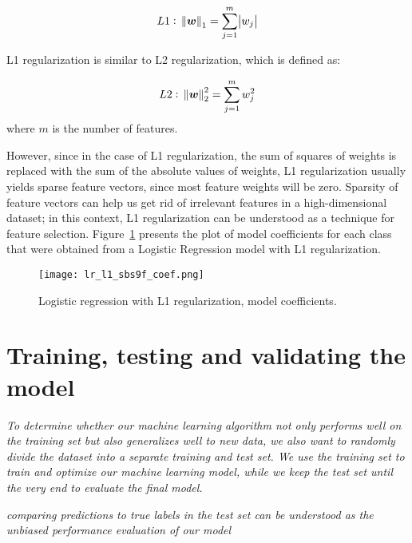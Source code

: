 \begin{equation} \label{eq:l1_regularization}
    L1:~\norm{\boldsymbol{w}}_1 = \sum \limits_{j=1}^m \abs{w_j}
\end{equation}

L1 regularization is similar to L2 regularization, which is defined as:

\begin{equation} \label{eq:l2_regularization}
    L2:~\norm{\boldsymbol{w}}_2^2 = \sum \limits_{j=1}^m w_j^2
\end{equation}
where $m$ is the number of features.

However, since in the case of L1 regularization, the sum of squares of weights is replaced with the sum of the absolute values of weights, L1 regularization usually yields sparse feature vectors, since most feature weights will be zero\cite{RaschkaMirjalili2017,Scikit-learndevelopers2019}.
Sparsity of feature vectors can help us get rid of irrelevant features in a high-dimensional dataset;
in this context, L1 regularization can be understood as a technique for feature selection\cite{RaschkaMirjalili2017}.
Figure~\ref{fig:lr_l1_sbs9f_coef} presents the plot of model coefficients for each class that were obtained from a Logistic Regression model with L1 regularization.

\begin{figure}[hbt!]
    \centering
    \texttt{[image: lr\_l1\_sbs9f\_coef.png]}
    \caption{Logistic regression with L1 regularization, model coefficients.}
    \label{fig:lr_l1_sbs9f_coef}
\end{figure}



\section{Training, testing and validating the model} \label{sec:train_test_validate_model}

\textit{To determine whether our machine learning algorithm not only performs well on the training set but also generalizes well to new data, we also want to randomly divide the dataset into a separate training and test set. We use the training set to train and optimize our machine learning model, while we keep the test set until the very end to evaluate the final model.}

\textit{comparing predictions to true labels in the test set can be understood as the unbiased performance evaluation of our model}

